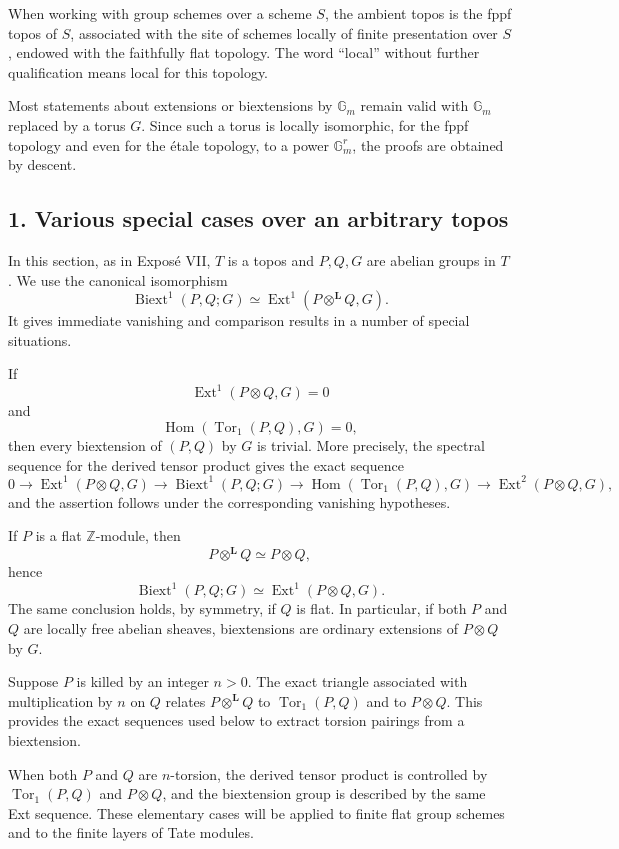 \documentclass[11pt]{article}
\newcommand{\bZ}{\mathbb Z}
\newcommand{\bL}{\mathbf L}
\newcommand{\Gm}{\mathbb G_m}
\newcommand{\Ext}{\operatorname{Ext}}
\newcommand{\Tor}{\operatorname{Tor}}
\newcommand{\Hom}{\operatorname{Hom}}
\newcommand{\Biext}{\operatorname{Biext}}
\begin{document}
When working with group schemes over a scheme \(S\), the ambient topos is the
fppf topos of \(S\), associated with the site of schemes locally of finite
presentation over \(S\), endowed with the faithfully flat topology. The word
``local'' without further qualification means local for this topology.

Most statements about extensions or biextensions by \(\Gm\) remain valid with
\(\Gm\) replaced by a torus \(G\). Since such a torus is locally isomorphic, for
the fppf topology and even for the étale topology, to a power \(\Gm^r\), the
proofs are obtained by descent.

\subsection*{1. Various special cases over an arbitrary topos}

In this section, as in Exposé VII, \(T\) is a topos and \(P,Q,G\) are abelian
groups in \(T\). We use the canonical isomorphism
\[
\Biext^1(P,Q;G)\simeq
\Ext^1(P\otimes^{\bL}Q,G).
\]
It gives immediate vanishing and comparison results in a number of special
situations.

If
\[
\Ext^1(P\otimes Q,G)=0
\]
and
\[
\Hom(\Tor_1(P,Q),G)=0,
\]
then every biextension of \((P,Q)\) by \(G\) is trivial. More precisely, the
spectral sequence for the derived tensor product gives the exact sequence
\[
0\to \Ext^1(P\otimes Q,G)\to \Biext^1(P,Q;G)\to
\Hom(\Tor_1(P,Q),G)\to \Ext^2(P\otimes Q,G),
\]
and the assertion follows under the corresponding vanishing hypotheses.

If \(P\) is a flat \(\bZ\)-module, then
\[
P\otimes^{\bL}Q\simeq P\otimes Q,
\]
hence
\[
\Biext^1(P,Q;G)\simeq \Ext^1(P\otimes Q,G).
\]
The same conclusion holds, by symmetry, if \(Q\) is flat. In particular, if both
\(P\) and \(Q\) are locally free abelian sheaves, biextensions are ordinary
extensions of \(P\otimes Q\) by \(G\).

Suppose \(P\) is killed by an integer \(n>0\). The exact triangle associated with
multiplication by \(n\) on \(Q\) relates \(P\otimes^{\bL}Q\) to
\(\Tor_1(P,Q)\) and to \(P\otimes Q\). This provides the exact sequences used
below to extract torsion pairings from a biextension.

When both \(P\) and \(Q\) are \(n\)-torsion, the derived tensor product is
controlled by \(\Tor_1(P,Q)\) and \(P\otimes Q\), and the biextension group is
described by the same Ext sequence. These elementary cases will be applied to
finite flat group schemes and to the finite layers of Tate modules.
\end{document}
